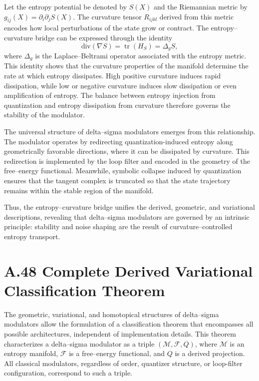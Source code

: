 Let the entropy potential be denoted by \(S(X)\) and the Riemannian metric by \(g_{ij}(X) = \partial_i \partial_j S(X)\). The curvature tensor \(R_{ijkl}\) derived from this metric encodes how local perturbations of the state grow or contract. The entropy–curvature bridge can be expressed through the identity
\[
\mathrm{div}(\nabla S) = \operatorname{tr}(H_S) = \Delta_g S,
\]
where \(\Delta_g\) is the Laplace–Beltrami operator associated with the entropy metric. This identity shows that the curvature properties of the manifold determine the rate at which entropy dissipates. High positive curvature induces rapid dissipation, while low or negative curvature induces slow dissipation or even amplification of entropy. The balance between entropy injection from quantization and entropy dissipation from curvature therefore governs the stability of the modulator.

The universal structure of delta–sigma modulators emerges from this relationship. The modulator operates by redirecting quantization-induced entropy along geometrically favorable directions, where it can be dissipated by curvature. This redirection is implemented by the loop filter and encoded in the geometry of the free–energy functional. Meanwhile, symbolic collapse induced by quantization ensures that the tangent complex is truncated so that the state trajectory remains within the stable region of the manifold.

Thus, the entropy–curvature bridge unifies the derived, geometric, and variational descriptions, revealing that delta–sigma modulators are governed by an intrinsic principle: stability and noise shaping are the result of curvature–controlled entropy transport.

\section{A.48 Complete Derived Variational Classification Theorem}

The geometric, variational, and homotopical structures of delta–sigma modulators allow the formulation of a classification theorem that encompasses all possible architectures, independent of implementation details. This theorem characterizes a delta–sigma modulator as a triple \((\mathcal{M},\mathcal{F},Q)\), where \(\mathcal{M}\) is an entropy manifold, \(\mathcal{F}\) is a free–energy functional, and \(Q\) is a derived projection. All classical modulators, regardless of order, quantizer structure, or loop-filter configuration, correspond to such a triple.

